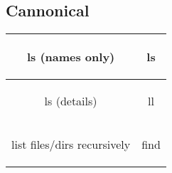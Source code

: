 
\section*{}
\subsection*{Cannonical}
\begin{tabular}{|c||c|} %
    \hline
    ls (names only) & \begin{bash}
ls
    \end{bash} \\ \hline
    ls (details) & \begin{bash}
ll
    \end{bash} \\ \hline
    list files/dirs recursively & \begin{bash}
find
    \end{bash} \\ \hline
\end{tabular}
